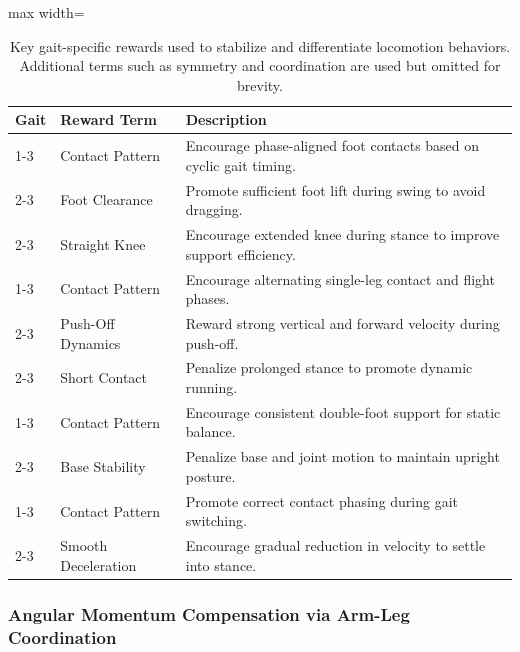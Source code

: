 \documentclass[letterpaper, 10 pt, conference]{ieeeconf}
\renewcommand{\arraystretch}{1.2}
\begin{document}
\begin{table}
\setlength{\abovecaptionskip}{4pt}
\setlength{\belowcaptionskip}{2pt}
\caption{Representative Human-Inspired Reward Terms by Gait Mode}
\label{tab:reward-gaits}
\renewcommand{\arraystretch}{1.05}
\setlength{\tabcolsep}{2.5pt}
\centering
\begin{adjustbox}{max width=\linewidth}
\begin{tabularx}{\linewidth}{p{13mm}|p{18mm}|X}
\toprule
\textbf{Gait} & \textbf{Reward Term} & \textbf{Description} \\
\cmidrule(lr){1-3}
\multirow{3}{*}{Walking} 
& Contact Pattern & Encourage phase-aligned foot contacts based on cyclic gait timing. \\
\cmidrule(lr){2-3}
& Foot Clearance & Promote sufficient foot lift during swing to avoid dragging. \\
\cmidrule(lr){2-3}
& Straight Knee & Encourage extended knee during stance to improve support efficiency. \\
\cmidrule(lr){1-3}
\multirow{3}{*}{Running} 
& Contact Pattern & Encourage alternating single-leg contact and flight phases. \\
\cmidrule(lr){2-3}
& Push-Off Dynamics & Reward strong vertical and forward velocity during push-off. \\
\cmidrule(lr){2-3}
& Short Contact & Penalize prolonged stance to promote dynamic running. \\
\cmidrule(lr){1-3}
\multirow{2}{*}{Standing} 
& Contact Pattern & Encourage consistent double-foot support for static balance. \\
\cmidrule(lr){2-3}
& Base Stability & Penalize base and joint motion to maintain upright posture. \\
\cmidrule(lr){1-3}
\multirow{2}{*}{Transition} 
& Contact Pattern & Promote correct contact phasing during gait switching. \\
\cmidrule(lr){2-3}
& Smooth Deceleration & Encourage gradual reduction in velocity to settle into stance. \\
\bottomrule
\end{tabularx}
\end{adjustbox}
\vspace{-0.4em}
\caption*{\footnotesize 
Key gait-specific rewards used to stabilize and differentiate locomotion behaviors. 
Additional terms such as symmetry and coordination are used but omitted for brevity.}
\end{table}

\noindent
\subsubsection{Angular Momentum Compensation via Arm-Leg Coordination}
\end{document}
